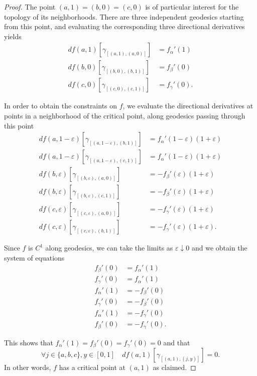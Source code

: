 \documentclass[10pt,a4paper]{amsart}
\begin{document}
\begin{proof}
  The point $(a, 1) = (b, 0) = (c, 0)$ is of particular interest for the
  topology of its neighborhoods. There are three independent geodesics starting
  from this point, and evaluating the corresponding three directional derivatives yields
  \begin{align*}
    df(a, 1)[\gamma_{[(a, 1), (a, 0)]}] &= f_\alpha'(1) \\
    df(b, 0)[\gamma_{[(b, 0), (b, 1)]}] &= f_\beta'(0) \\
    df(c, 0)[\gamma_{[(c, 0), (c, 1)]}] &= f_\gamma'(0).
  \end{align*}

  In order to obtain the constraints on $f$, we evaluate the directional
  derivatives at points in a neighborhood of the critical point, along geodesics
  passing through this point
  \begin{align*}
    df(a, 1-\varepsilon)[\gamma_{[(a, 1-\varepsilon), (b, 1)]}] &= f_\alpha'(1-\varepsilon) (1 + \varepsilon) \\
    df(a, 1-\varepsilon)[\gamma_{[(a, 1-\varepsilon), (c, 1)]}] &= f_\alpha'(1-\varepsilon) (1 + \varepsilon) \\
    df(b, \varepsilon)[\gamma_{[(b, \varepsilon), (a, 0)]}]     &= - f_\beta'(\varepsilon) (1 + \varepsilon) \\
    df(b, \varepsilon)[\gamma_{[(b, \varepsilon), (c, 1)]}]     &= - f_\beta'(\varepsilon) (1 + \varepsilon) \\
    df(c, \varepsilon)[\gamma_{[(c, \varepsilon), (a, 0)]}]     &= - f_\gamma'(\varepsilon) (1 + \varepsilon) \\
    df(c, \varepsilon)[\gamma_{[(c, \varepsilon), (b, 1)]}]     &= - f_\gamma'(\varepsilon) (1 + \varepsilon).
  \end{align*}

  Since $f$ is $C^1$ along geodesics, we can take the limits as $\varepsilon \downarrow 0$ and
  we obtain the system of equations
  \begin{align*}
    f_\beta'(0) &=   f_\alpha'(1) \\
    f_\gamma'(0) &=   f_\alpha'(1) \\
    f_\alpha'(1) &= - f_\beta'(0) \\
    f_\gamma'(0) &= - f_\beta'(0) \\
    f_\alpha'(1) &= - f_\gamma'(0) \\
    f_\beta'(0) &= - f_\gamma'(0).
  \end{align*}

  This shows that $f_\alpha'(1) = f_\beta'(0) = f_\gamma'(0) = 0$ and that
  \begin{equation*}
    \forall j \in \{a, b, c\}, y \in [0, 1]\quad df(a, 1)[\gamma_{[(a, 1), (j, y)]}] = 0.
  \end{equation*}
  In other words, $f$ has a critical point at $(a,1)$ as claimed. 
\end{proof}
\end{document}
